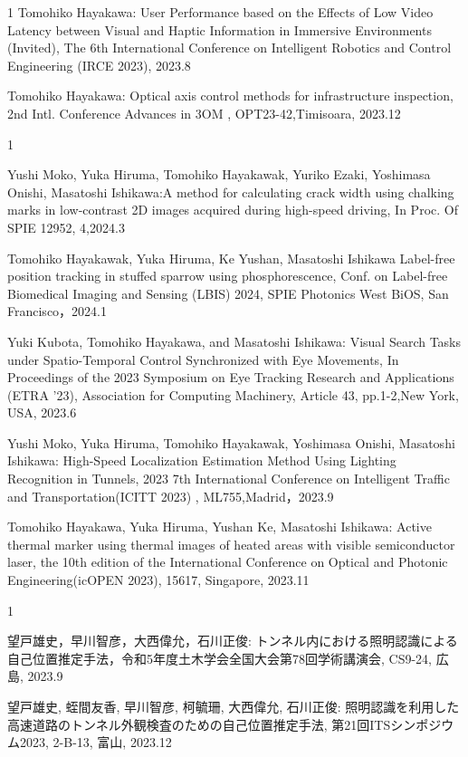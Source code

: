 \begin{招待講演}{1}
Tomohiko Hayakawa:  User Performance based on the Effects of Low Video Latency between Visual and Haptic Information in Immersive Environments (Invited), The 6th International Conference on Intelligent Robotics and Control Engineering (IRCE 2023), 2023.8

Tomohiko Hayakawa:  Optical axis control methods for infrastructure inspection, 2nd Intl. Conference Advances in 3OM , OPT23-42,Timisoara, 2023.12

\end{招待講演}

\begin{査読付}{1}

Yushi Moko, Yuka Hiruma, Tomohiko Hayakawak, Yuriko Ezaki, Yoshimasa Onishi, Masatoshi Ishikawa:A method for calculating crack width using chalking marks in low-contrast 2D images acquired during high-speed driving, In Proc. Of SPIE 12952, 4,2024.3

Tomohiko Hayakawak, Yuka Hiruma, Ke Yushan, Masatoshi Ishikawa
Label-free position tracking in stuffed sparrow using phosphorescence, Conf. on Label-free Biomedical Imaging and Sensing (LBIS) 2024, SPIE Photonics West BiOS, San Francisco，2024.1

Yuki Kubota, Tomohiko Hayakawa, and Masatoshi Ishikawa: Visual Search Tasks under Spatio-Temporal Control Synchronized with Eye Movements, In Proceedings of the 2023 Symposium on Eye Tracking Research and Applications (ETRA '23), Association for Computing Machinery, Article 43, pp.1-2,New York, USA, 2023.6

Yushi Moko, Yuka Hiruma, Tomohiko Hayakawak, Yoshimasa Onishi, Masatoshi Ishikawa:  High-Speed Localization Estimation Method Using Lighting Recognition in Tunnels, 2023 7th International Conference on Intelligent Traffic and Transportation(ICITT 2023) , ML755,Madrid，2023.9

Tomohiko Hayakawa, Yuka Hiruma, Yushan Ke, Masatoshi Ishikawa: Active thermal marker using thermal images of heated areas with visible semiconductor laser, the 10th edition of the International Conference on Optical and Photonic Engineering(icOPEN 2023), 15617, Singapore, 2023.11

\end{査読付}

\begin{発表}{1}

望戸雄史，早川智彦，大西偉允，石川正俊:  トンネル内における照明認識による自己位置推定手法，令和5年度土木学会全国大会第78回学術講演会, CS9-24, 広島, 2023.9

望戸雄史, 蛭間友香, 早川智彦, 柯毓珊, 大西偉允, 石川正俊:  照明認識を利用した高速道路のトンネル外観検査のための自己位置推定手法, 第21回ITSシンポジウム2023, 2-B-13, 富山, 2023.12

\end{発表}

